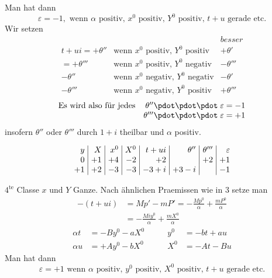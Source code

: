 Man hat dann
\[
\varepsilon=-1,\text{ wenn }\alpha\text{ positiv, }x^0\text{ positiv, }Y^0\text{ positiv, }t+u\text{ gerade etc.}
\]
Wir setzen
\[
\begin{array}{rll}
&&\textit{besser}\\
t+ui=+\theta''&\text{wenn }x^0\text{ positiv, }Y^0\text{ positiv}&+\theta'\\
=+\theta'''&\text{wenn }x^0\text{ positiv, }Y^0\text{ negativ}&-\theta'''\\
-\theta''&\text{wenn }x^0\text{ negativ, }Y^0\text{ negativ}&-\theta'\\
-\theta'''&\text{wenn }x^0\text{ negativ, }Y^0\text{ positiv}&+\theta'''
\end{array}
\]
\[
\begin{array}{lr}
\text{Es wird also für jedes}&\theta''\pdot\pdot\pdot\;\varepsilon=-1\\
&\theta'''\pdot\pdot\pdot\;\varepsilon=+1
\end{array}
\]
insofern $\theta''$ oder $\theta'''$ durch $1+i$ theilbar und $\alpha$ positiv.

\[
\setlength{\arraycolsep}{4pt}
\begin{array}{r|r|r|r|r|r|r|r}
y&X&x^0&X^0&t+ui&\theta''&\theta'''&\varepsilon\\
0&+1&+4&-2&+2&&+2&+1\\
+1&+2&-3&-3&-3+i&+3-i&&-1
\end{array}
\]

$4^{\mathrm{te}}$ Classe $x$ und $Y$ Ganze. Nach ähnlichen Praemissen wie in 3 setze man
\[
\begin{aligned}
-(t+ui)&=Mp'-mP'=-\frac{Mp^0}{\alpha}+\frac{mP^0}{\alpha}\\
&=-\frac{Miy^0}{\alpha}+\frac{mX^0}{\alpha}
\end{aligned}
\]
\[
\begin{alignedat}{2}
\alpha t&=-By^0-aX^0\qquad&y^0&=-bt+au\\
\alpha u&=+Ay^0-bX^0&X^0&=-At-Bu
\end{alignedat}
\]
Man hat dann
\[
\varepsilon=+1\text{ wenn }\alpha\text{ positiv, }y^0\text{ positiv, }X^0\text{ positiv, }t+u\text{ gerade etc.}
\]

